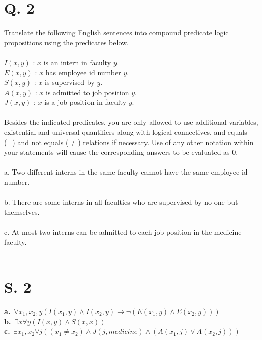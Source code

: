 \documentclass[11pt]{article}
\begin{document}
\newpage
\section*{Q. 2}
Translate the following English sentences into compound predicate logic propositions using the predicates below.\\\\
$ I(x, y) $ : $ x $ is an intern in faculty $ y $.\\
$ E(x, y) $ : $ x $ has employee id number $ y $.\\
$ S(x, y) $ : $ x $ is supervised by $ y $.\\
$ A(x, y) $ : $ x $ is admitted to job position $ y $.\\
$ J(x, y) $ : $ x $ is a job position in faculty $ y $.\\\\
Besides the indicated predicates, you are only allowed to use additional variables, existential and universal quantifiers along with logical connectives, and equals (=) and not equals ($ \neq $) relations if necessary. Use of any other notation within your statements will cause the corresponding answers to be evaluated as 0.\\\\

a. Two different interns in the same faculty cannot have the same employee id number.\\\\

b. There are some interns in all faculties who are supervised by no one but themselves.\\\\

c. At most two interns can be admitted to each job position in the medicine faculty.\\\\

\section*{S. 2}
\hspace{5mm}

\textbf{a.}\ $\forall x_1, x_2, y (I(x_1, y) \land I(x_2, y) \rightarrow \neg(E(x_1, y) \land E(x_2, y)))$\\

\textbf{b.}\ $\exists x \forall y (I(x, y) \land S(x, x))$\\

\textbf{c.}\ $ \exists x_1, x_2 \forall j ((x_1 \neq x_2) \land J(j, medicine) \land (A(x_1, j) \lor A(x_2, j))) $\\
\end{document}
